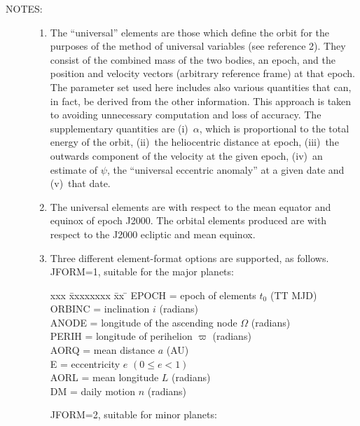\documentclass[11pt,twoside]{article}
\newlength{\oldspacing}
\newcommand{\notes}[1]
{
  \goodbreak
  \setlength{\oldspacing}{\topsep}
  \setlength{\topsep}{0.3ex}
  \begin{description}
    \item[NOTES]:
        #1
  \end{description}
  \setlength{\topsep}{\oldspacing}
}
\renewcommand{\notes}[1]
   {
      \begin{description}
         \item[NOTES:]
            #1
      \end{description}
   }
\begin{document}
\notes
{
 \begin{enumerate}
  \setlength{\parskip}{\medskipamount}
  \item The ``universal'' elements are those which define the orbit for the
        purposes of the method of universal variables (see reference 2).
        They consist of the combined mass of the two bodies, an epoch,
        and the position and velocity vectors (arbitrary reference frame)
        at that epoch.  The parameter set used here includes also various
        quantities that can, in fact, be derived from the other
        information.  This approach is taken to avoiding unnecessary
        computation and loss of accuracy.  The supplementary quantities
        are (i)~$\alpha$, which is proportional to the total energy of the
        orbit, (ii)~the heliocentric distance at epoch,
        (iii)~the outwards component of the velocity at the given epoch,
        (iv)~an estimate of $\psi$, the ``universal eccentric anomaly'' at a
        given date and (v)~that date.
  \item The universal elements are with respect to the mean equator and
        equinox of epoch J2000.  The orbital elements produced are with
        respect to the J2000 ecliptic and mean equinox.
  \item Three different element-format options are supported, as
        follows. \\

        JFORM=1, suitable for the major planets:

        \begin{tabbing}
        xxx \= xxxxxxxx \= xx \= \kill
        \> EPOCH  \> = \> epoch of elements $t_0$ (TT MJD) \\
        \> ORBINC \> = \> inclination $i$ (radians) \\
        \> ANODE  \> = \> longitude of the ascending node $\Omega$ (radians) \\
        \> PERIH  \> = \> longitude of perihelion $\varpi$ (radians) \\
        \> AORQ   \> = \> mean distance $a$ (AU) \\
        \> E      \> = \> eccentricity $e$ $( 0 \leq e < 1 )$ \\
        \> AORL   \> = \> mean longitude $L$ (radians) \\
        \> DM     \> = \> daily motion $n$ (radians)
        \end{tabbing}

        JFORM=2, suitable for minor planets:


\end{enumerate}}
\end{document}
